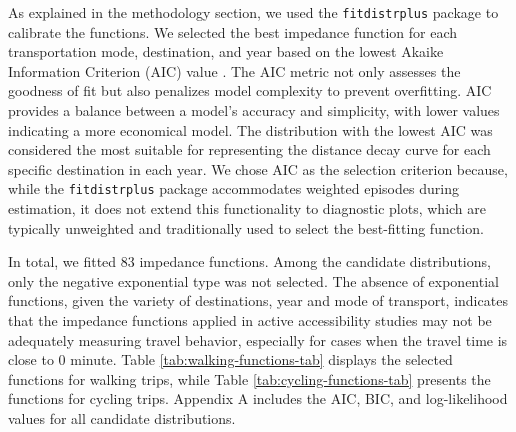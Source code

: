 \documentclass[preprint, 3p,
authoryear]{elsarticle} %
\begin{document}
As explained in the methodology section, we used the
\texttt{fitdistrplus} package \citep{delignette2015fitdistrplus} to
calibrate the functions. We selected the best impedance function for
each transportation mode, destination, and year based on the lowest
Akaike Information Criterion (AIC) value \citep{akaike1974}. The AIC
metric not only assesses the goodness of fit but also penalizes model
complexity to prevent overfitting. AIC provides a balance between a
model's accuracy and simplicity, with lower values indicating a more
economical model. The distribution with the lowest AIC was considered
the most suitable for representing the distance decay curve for each
specific destination in each year. We chose AIC as the selection
criterion because, while the \texttt{fitdistrplus} package accommodates
weighted episodes during estimation, it does not extend this
functionality to diagnostic plots, which are typically unweighted and
traditionally used to select the best-fitting function.

In total, we fitted 83 impedance functions. Among the candidate
distributions, only the negative exponential type was not selected. The
absence of exponential functions, given the variety of destinations,
year and mode of transport, indicates that the impedance functions
applied in active accessibility studies may not be adequately measuring
travel behavior, especially for cases when the travel time is close to 0
minute. Table \ref{tab:walking-functions-tab} displays the selected
functions for walking trips, while Table \ref{tab:cycling-functions-tab}
presents the functions for cycling trips. Appendix A includes the AIC,
BIC, and log-likelihood values for all candidate distributions.
\end{document}
